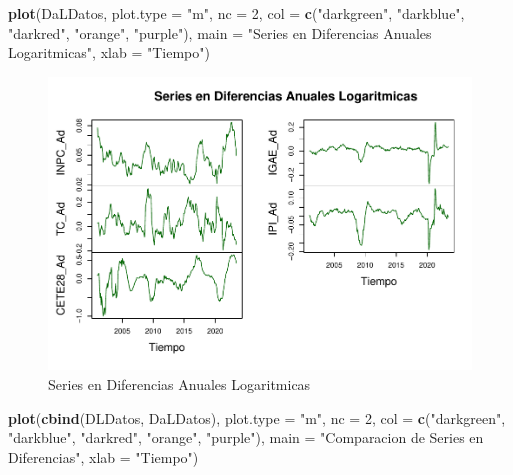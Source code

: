 \documentclass[
]{book}
\newenvironment{Shaded}{\begin{snugshade}}{\end{snugshade}}
\newcommand{\AttributeTok}[1]{\textcolor[rgb]{0.13,0.29,0.53}{#1}}
\newcommand{\DecValTok}[1]{\textcolor[rgb]{0.00,0.00,0.81}{#1}}
\newcommand{\FunctionTok}[1]{\textcolor[rgb]{0.13,0.29,0.53}{\textbf{#1}}}
\newcommand{\NormalTok}[1]{#1}
\newcommand{\StringTok}[1]{\textcolor[rgb]{0.31,0.60,0.02}{#1}}
\begin{document}
\begin{Shaded}
\begin{Highlighting}[]
\FunctionTok{plot}\NormalTok{(DaLDatos, }
     \AttributeTok{plot.type =} \StringTok{"m"}\NormalTok{, }\AttributeTok{nc =} \DecValTok{2}\NormalTok{,}
     \AttributeTok{col =} \FunctionTok{c}\NormalTok{(}\StringTok{"darkgreen"}\NormalTok{, }\StringTok{"darkblue"}\NormalTok{, }\StringTok{"darkred"}\NormalTok{, }\StringTok{"orange"}\NormalTok{, }\StringTok{"purple"}\NormalTok{), }
     \AttributeTok{main =} \StringTok{"Series en Diferencias Anuales Logaritmicas"}\NormalTok{, }
     \AttributeTok{xlab =} \StringTok{"Tiempo"}\NormalTok{)}
\end{Highlighting}
\end{Shaded}

\begin{figure}

{\centering \includegraphics{Notas-Series-Tiempo_files/figure-latex/fig73-1} 

}

\caption{Series en Diferencias Anuales Logaritmicas}\label{fig:fig73}
\end{figure}

\begin{Shaded}
\begin{Highlighting}[]
\FunctionTok{plot}\NormalTok{(}\FunctionTok{cbind}\NormalTok{(DLDatos, DaLDatos), }
     \AttributeTok{plot.type =} \StringTok{"m"}\NormalTok{, }\AttributeTok{nc =} \DecValTok{2}\NormalTok{,}
     \AttributeTok{col =} \FunctionTok{c}\NormalTok{(}\StringTok{"darkgreen"}\NormalTok{, }\StringTok{"darkblue"}\NormalTok{, }\StringTok{"darkred"}\NormalTok{, }\StringTok{"orange"}\NormalTok{, }\StringTok{"purple"}\NormalTok{), }
     \AttributeTok{main =} \StringTok{"Comparacion de Series en Diferencias"}\NormalTok{, }
     \AttributeTok{xlab =} \StringTok{"Tiempo"}\NormalTok{)}
\end{Highlighting}
\end{Shaded}
\end{document}

